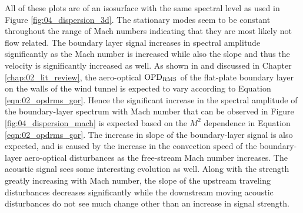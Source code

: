 All of these plots are of an isosurface with the same spectral level as used in Figure \ref{fig:04_dispersion_3d}.
The stationary modes seem to be constant throughout the range of Mach numbers indicating that they are most likely not flow related.
The boundary layer signal increases in spectral amplitude significantly as the Mach number is increased while also the slope and thus the velocity is significantly increased as well.
As shown in  and discussed in Chapter \ref{chap:02_lit_review}, the aero-optical $\operatorname{OPD_{RMS}}$ of the flat-plate boundary layer on the walls of the wind tunnel is expected to vary according to Equation \ref{eqn:02_opdrms_gor}.
Hence the significant increase in the spectral amplitude of the boundary-layer spectrum with Mach number that can be observed in Figure \ref{fig:04_dispersion_mach} is expected based on the $M^2$ dependence in Equation \ref{eqn:02_opdrms_gor}.
The increase in slope of the boundary-layer signal is also expected, and is caused by the increase in the convection speed of the boundary-layer aero-optical disturbances as the free-stream Mach number increases.
The acoustic signal sees some interesting evolution as well.
Along with the strength greatly increasing with Mach number, the slope of the upstream traveling disturbances decreases significantly while the downstream moving acoustic disturbances do not see much change other than an increase in signal strength.

